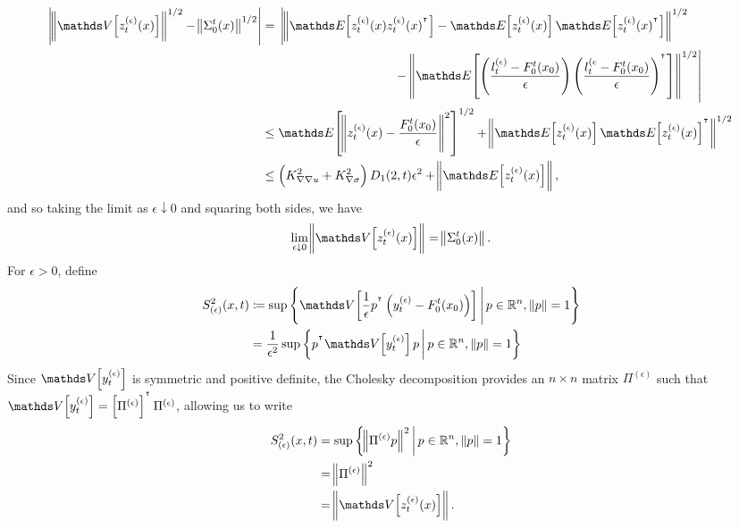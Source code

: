 \begin{align*}
	\abs{\norm{\var{z_t^{(\epsilon)}(x)}}^{1/2} - \norm{\Sigma_0^t(x)}^{1/2}} & = \begin{multlined}[t]
		                                                                              \left|\norm{\avg{z_t^{(\epsilon)}(x)z_t^{(\epsilon)}(x)^{\T}} - \avg{z_t^{(\epsilon)}(x)}\avg{z_t^{(\epsilon)}(x)^{\T}}}^{1/2}\right. \\
		                                                                              - \left.\norm{\avg{\left(\frac{l_t^{(\epsilon)} - F_0^t\!\left(x_0\right)}{\epsilon}\right) \left(\frac{l_t^{(\epsilon} - F_0^t\!\left(x_0\right)}{\epsilon}\right)^{\T}}}^{1/2}\right|
	                                                                              \end{multlined} \\
	                                                                          & \leq \avg{\norm{z_t^{(\epsilon)}(x) - \frac{F_0^t\!\left(x_0\right)}{\epsilon}}^2}^{1/2} + \norm{\avg{z_t^{(\epsilon)}(x)}\avg{z_t^{(\epsilon)}(x)}^{\T}}^{1/2}                          \\
	                                                                          & \leq \left(K_{\nabla \nabla u}^2 + K_{\nabla\sigma}^2\right) D_1(2,t)\epsilon^2 + \norm{\avg{z_t^{(\epsilon)}(x)}},
\end{align*}
and so taking the limit as \(\epsilon\downarrow 0\) and squaring both sides, we have
\begin{equation}
	\lim_{\epsilon\downarrow 0}\norm{\var{z_t^{(\epsilon)}(x)}} = \norm{\Sigma_0^t(x)}.
	\label{eqn:sigma_lim}
\end{equation}
For \(\epsilon > 0\), define
\begin{align*}
	S^2_{(\epsilon)}(x,t) & \coloneqq \sup{\setc{\var{\frac{1}{\epsilon} p^{\T}\left(y_t^{(\epsilon)} - F_0^t\!\left(x_0\right)\right)}}{p \in \R^n, \, \norm{p} = 1}} \\
	                      & = \frac{1}{\epsilon^2}\sup{\setc{p^{\T}\var{y_t^{(\epsilon)}}p}{p \in \R^n, \, \norm{p} = 1}}
\end{align*}
Since \(\var{y_t^{(\epsilon)}}\) is symmetric and positive definite, the Cholesky decomposition provides an \(n \times n\) matrix \(\Pi^{(\epsilon)}\) such that \(\var{y_t^{(\epsilon)}} = \left[\Pi^{(\epsilon)}\right]^{\T}\Pi^{(\epsilon)}\), allowing us to write
\begin{align*}
	S^2_{(\epsilon)}(x,t) & = \sup\setc{\norm{\Pi^{(\epsilon)}p}^2}{p \in \R^n, \, \norm{p} = 1} \\
	                      & = \norm{\Pi^{(\epsilon)}}^2                                          \\
	                      & = \norm{\var{z_t^{(\epsilon)}(x)}}.
\end{align*}
